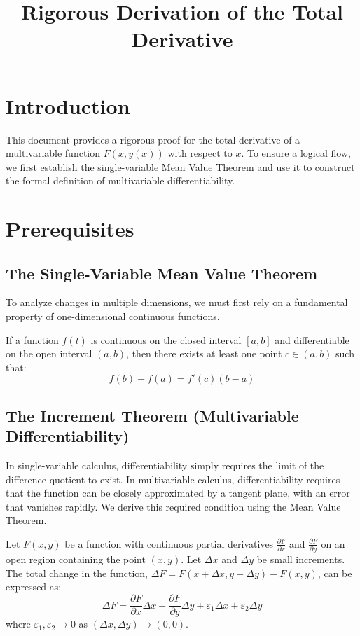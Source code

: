 \documentclass{essay}
\title{Rigorous Derivation of the Total Derivative}
\author{}
\date{}
\begin{document}
\maketitle

\section{Introduction}

This document provides a rigorous proof for the total derivative of a multivariable function $F(x, y(x))$ with respect to $x$. To ensure a logical flow, we first establish the single-variable Mean Value Theorem and use it to construct the formal definition of multivariable differentiability.

\section{Prerequisites}

\subsection{The Single-Variable Mean Value Theorem}
To analyze changes in multiple dimensions, we must first rely on a fundamental property of one-dimensional continuous functions.

\begin{lemma}
If a function $f(t)$ is continuous on the closed interval $[a, b]$ and differentiable on the open interval $(a, b)$, then there exists at least one point $c \in (a, b)$ such that:
\[ f(b) - f(a) = f'(c)(b - a) \]
\end{lemma}

\subsection{The Increment Theorem (Multivariable Differentiability)}
In single-variable calculus, differentiability simply requires the limit of the difference quotient to exist. In multivariable calculus, differentiability requires that the function can be closely approximated by a tangent plane, with an error that vanishes rapidly. We derive this required condition using the Mean Value Theorem.

\begin{theorem}
Let $F(x,y)$ be a function with continuous partial derivatives $\frac{\partial F}{\partial x}$ and $\frac{\partial F}{\partial y}$ on an open region containing the point $(x,y)$. Let $\Delta x$ and $\Delta y$ be small increments. The total change in the function, $\Delta F = F(x+\Delta x, y+\Delta y) - F(x,y)$, can be expressed as:
\[ \Delta F = \frac{\partial F}{\partial x}\Delta x + \frac{\partial F}{\partial y}\Delta y + \varepsilon_1 \Delta x + \varepsilon_2 \Delta y \]
where $\varepsilon_1, \varepsilon_2 \to 0$ as $(\Delta x, \Delta y) \to (0,0)$.
\end{theorem}
\end{document}
